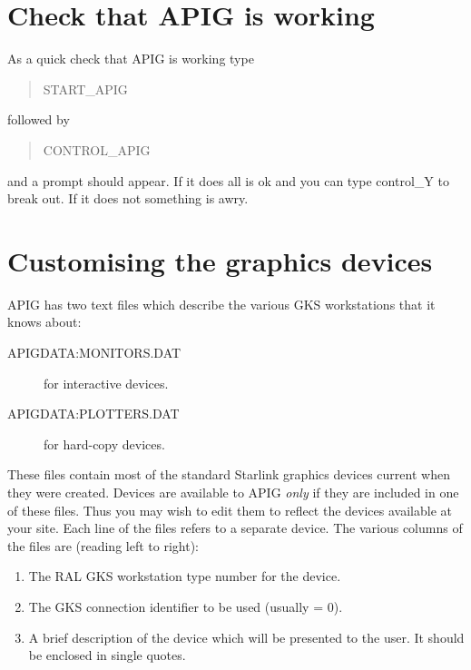 \section{Check that APIG is working}

As a quick check that APIG is working type

\begin{verse}

START\_APIG

\end{verse}

followed by

\begin{verse}

CONTROL\_APIG

\end{verse}

and a prompt should appear. If it does all is ok and you can type
control\_Y to break out. If it does not something is awry.

\section{Customising the graphics devices}

APIG has two text files which describe the various GKS workstations
that it knows about:

\begin{description}

  \item[APIGDATA:MONITORS.DAT] for interactive devices.

  \item[APIGDATA:PLOTTERS.DAT] for hard-copy devices.

\end{description}

These files contain most of the standard Starlink graphics devices
current when they were created. Devices are available to APIG {\em
only} if they are included in one of these files. Thus you may wish to
edit them to reflect the devices available at your site. Each line of
the files refers to a separate device. The various columns of the
files are (reading left to right):

\begin{enumerate}

  \item The RAL GKS workstation type number for the device.

  \item The GKS connection identifier to be used (usually = 0).

  \item A brief description of the device which will be presented to
   the user. It should be enclosed in single quotes.

\end{enumerate}

